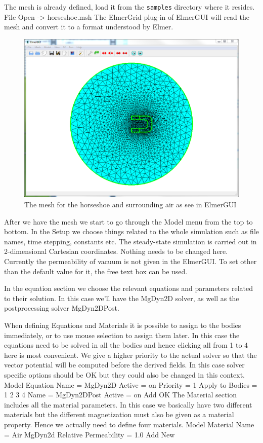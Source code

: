 The mesh is already defined, load it from the \texttt{samples} directory where it resides.
\ttbegin
File 
  Open -> horseshoe.msh
\ttend
The ElmerGrid plug-in of ElmerGUI will read the mesh and convert it to a format understood by Elmer. 

\begin{figure}[h]
\centering
\includegraphics[width=140mm]{HorseShoeMesh}
\caption{The mesh for the horseshoe and surrounding air as see in ElmerGUI}\label{fg:horseshoeselmergui}
\end{figure}  


After we have the mesh we start to go through the Model menu from the top to bottom. 
In the Setup we choose things related to the whole simulation such as file names, 
time stepping, constants etc.
The steady-state simulation is carried out in 2-dimensional Cartesian
coordinates. Nothing needs to be changed here. Currently the permeability of vacuum is not given
in the ElmerGUI. To set other than the default value for it, the free text box can be used. 

In the equation section we choose the relevant equations and parameters related to their solution. 
In this case we'll have the MgDyn2D solver, as well as the postprocessing solver MgDyn2DPost.

When defining Equations and Materials it is possible to assign to the bodies immediately, or to use mouse
selection to assign them later. In this case the equations need to be solved in all the bodies and 
hence clicking all from 1 to 4 here is most convenient. We give a higher priority to the actual solver
so that the vector potential will be computed before the derived fields. 
In this case solver specific options should be OK but they could also be changed in this context.
\ttbegin
Model
  Equation
    Name = MgDyn2D
      Active = on
      Priority = 1
      Apply to Bodies = 1 2 3 4 
    Name = MgDyn2DPost
      Active = on
    Add 
    OK
\ttend        
The Material section includes all the material parameters. In this case we basically have two 
different materials but the different magnetization must also be given as a material property.
Hence we actually need to define four materials.  
\ttbegin
Model
  Material
    Name = Air
    MgDyn2d
      Relative Permeability = 1.0
    Add
    New

